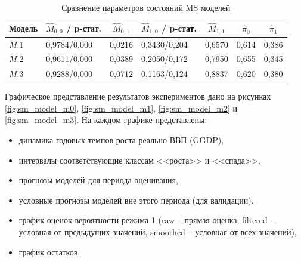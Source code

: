 \documentclass[a4paper,14pt]{extreport}
\begin{document}
\begin{table}[H]
	\begin{tabular}{l|ll|ll|ll}
		\hline
		\multicolumn{1}{c|}{\textbf{Модель}} & \multicolumn{1}{c}{$\hat{M}_{0,0}$ / p-стат.} & \multicolumn{1}{c|}{$\hat{M}_{0,1}$} & \multicolumn{1}{c}{$\hat{M}_{1,0}$ / p-стат.} & \multicolumn{1}{c|}{$\hat{M}_{1,1}$} & \multicolumn{1}{c}{$\hat{\pi}_0$} & \multicolumn{1}{c}{$\hat{\pi}_1$} \\ \hline
		$M.1$                                & 0,9784/0,000                                  & 0,0216                               & 0,3430/0,204                                  & 0,6570                               & 0,614                             & 0,386                             \\
		$M.2$                                & 0,9611/0,000                                  & 0,0389                               & 0,2050/0,172                                  & 0,7950                               & 0,655                             & 0,345                             \\
		$M.3$                                & 0,9288/0,000                                  & 0,0712                               & 0,1163/0,124                                  & 0,8837                               & 0,620                             & 0,380                             \\ \hline
	\end{tabular}
	\caption{Сравнение параметров состояний MS моделей}
	\label{tbl:ggdp_model_params_ms}
\end{table}


Графическое представление результатов экспериментов дано на рисунках \ref{fig:sm_model_m0}, \ref{fig:sm_model_m1}, \ref{fig:sm_model_m2} и \ref{fig:sm_model_m3}. На каждом графике представлены:
\begin{itemize}
	\item динамика годовых темпов роста реально ВВП (GGDP),
	\item интервалы соответствующие классам <<роста>> и <<спада>>,
	\item прогнозы моделей для периода оценивания,
	\item условные прогнозы моделей вне этого периода (для валидации),
	\item график оценок вероятности режима 1 (raw -- прямая оценка, filtered -- условная от предыдущих значений, smoothed -- условная от всех значений),
	\item график остатков.
\end{itemize}
\end{document}
